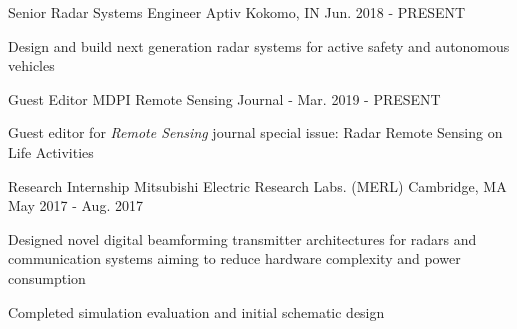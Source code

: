 
\begin{cventries}

  \cventry
    {Senior Radar Systems Engineer}
    {Aptiv}
    {Kokomo, IN}
    {Jun. 2018 - PRESENT}
    {
      \begin{cvitems}
        \item {Design and build next generation radar systems for active safety and autonomous vehicles}
      \end{cvitems}
    }
    
  \cventry
    {Guest Editor}
    {MDPI Remote Sensing Journal}
    {-}
    {Mar. 2019 - PRESENT}
    {
      \begin{cvitems}
        \item {Guest editor for {\em{Remote Sensing}} journal special issue: Radar Remote Sensing on Life Activities}
      \end{cvitems}
    }

  \cventry
    {Research Internship}
    {Mitsubishi Electric Research Labs. (MERL)}
    {Cambridge, MA}
    {May 2017 - Aug. 2017}
    {
      \begin{cvitems}
        \item {Designed novel digital beamforming transmitter architectures for radars and communication systems aiming to reduce hardware complexity and power consumption}
        \item {Completed simulation evaluation and initial schematic design}
      \end{cvitems}
    }

\end{cventries}
